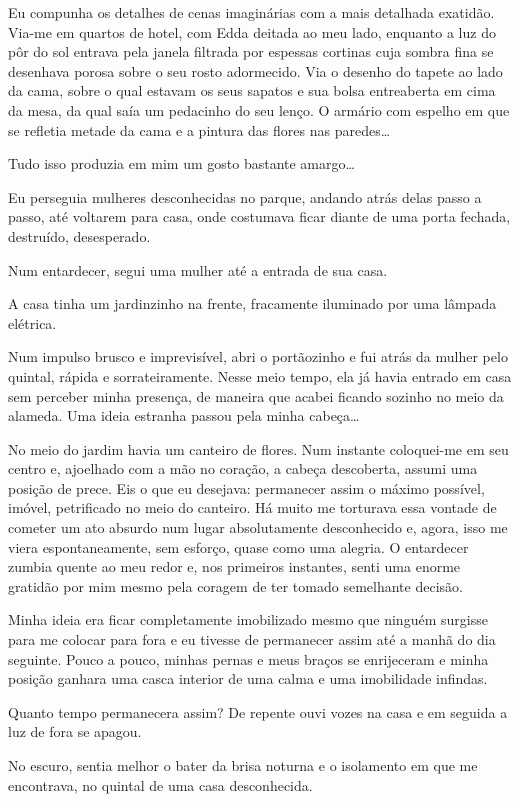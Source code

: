 Eu compunha os detalhes de cenas imaginárias com a mais detalhada exatidão. Via-me em quartos de hotel, com Edda deitada ao meu lado, enquanto a luz do pôr do sol entrava pela janela filtrada por espessas cortinas cuja sombra fina se desenhava porosa sobre o seu rosto adormecido. Via o desenho do tapete ao lado da cama, sobre o qual estavam os seus sapatos e sua bolsa entreaberta em cima da mesa, da qual saía um pedacinho do seu lenço. O armário com espelho em que se refletia metade da cama e a pintura das flores nas paredes\dots

Tudo isso produzia em mim um gosto bastante amargo\dots

Eu perseguia mulheres desconhecidas no parque, andando atrás delas passo a passo, até voltarem para casa, onde costumava ficar diante de uma porta fechada, destruído, desesperado.

Num entardecer, segui uma mulher até a entrada de sua casa.

A casa tinha um jardinzinho na frente, fracamente iluminado por uma lâmpada elétrica.

Num impulso brusco e imprevisível, abri o portãozinho e fui atrás da mulher pelo quintal, rápida e sorrateiramente. Nesse meio tempo, ela já havia entrado em casa sem perceber minha presença, de maneira que acabei ficando sozinho no meio da alameda. Uma ideia estranha passou pela minha cabeça\dots

No meio do jardim havia um canteiro de flores. Num instante coloquei-me em seu centro e, ajoelhado com a mão no coração, a cabeça descoberta, assumi uma posição de prece. Eis o que eu desejava: permanecer assim o máximo possível, imóvel, petrificado no meio do canteiro. Há muito me torturava essa vontade de cometer um ato absurdo num lugar absolutamente desconhecido e, agora, isso me viera espontaneamente, sem esforço, quase como uma alegria. O entardecer zumbia quente ao meu redor e, nos primeiros instantes, senti uma enorme gratidão por mim mesmo pela coragem de ter tomado semelhante decisão.

Minha ideia era ficar completamente imobilizado mesmo que ninguém surgisse para me colocar para fora e eu tivesse de permanecer assim até a manhã do dia seguinte. Pouco a pouco, minhas pernas e meus braços se enrijeceram e minha posição ganhara uma casca interior de uma calma e uma imobilidade infindas.

Quanto tempo permanecera assim? De repente ouvi vozes na casa e em seguida a luz de fora se apagou.

No escuro, sentia melhor o bater da brisa noturna e o isolamento em que me encontrava, no quintal de uma casa desconhecida.

